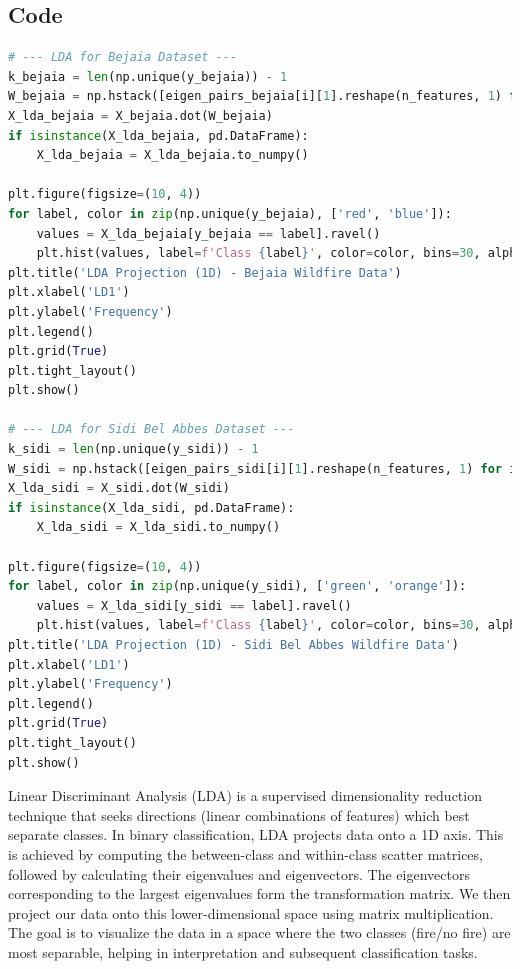 \documentclass[12pt]{article}
\begin{document}
\subsection*{Code}
\begin{lstlisting}[language=Python]
# --- LDA for Bejaia Dataset ---
k_bejaia = len(np.unique(y_bejaia)) - 1
W_bejaia = np.hstack([eigen_pairs_bejaia[i][1].reshape(n_features, 1) for i in range(k_bejaia)])
X_lda_bejaia = X_bejaia.dot(W_bejaia)
if isinstance(X_lda_bejaia, pd.DataFrame):
    X_lda_bejaia = X_lda_bejaia.to_numpy()

plt.figure(figsize=(10, 4))
for label, color in zip(np.unique(y_bejaia), ['red', 'blue']):
    values = X_lda_bejaia[y_bejaia == label].ravel()
    plt.hist(values, label=f'Class {label}', color=color, bins=30, alpha=0.7)
plt.title('LDA Projection (1D) - Bejaia Wildfire Data')
plt.xlabel('LD1')
plt.ylabel('Frequency')
plt.legend()
plt.grid(True)
plt.tight_layout()
plt.show()

# --- LDA for Sidi Bel Abbes Dataset ---
k_sidi = len(np.unique(y_sidi)) - 1
W_sidi = np.hstack([eigen_pairs_sidi[i][1].reshape(n_features, 1) for i in range(k_sidi)])
X_lda_sidi = X_sidi.dot(W_sidi)
if isinstance(X_lda_sidi, pd.DataFrame):
    X_lda_sidi = X_lda_sidi.to_numpy()

plt.figure(figsize=(10, 4))
for label, color in zip(np.unique(y_sidi), ['green', 'orange']):
    values = X_lda_sidi[y_sidi == label].ravel()
    plt.hist(values, label=f'Class {label}', color=color, bins=30, alpha=0.7)
plt.title('LDA Projection (1D) - Sidi Bel Abbes Wildfire Data')
plt.xlabel('LD1')
plt.ylabel('Frequency')
plt.legend()
plt.grid(True)
plt.tight_layout()
plt.show()
\end{lstlisting}

Linear Discriminant Analysis (LDA) is a supervised dimensionality reduction technique that seeks directions (linear combinations of features) which best separate classes. In binary classification, LDA projects data onto a 1D axis. This is achieved by computing the between-class and within-class scatter matrices, followed by calculating their eigenvalues and eigenvectors. The eigenvectors corresponding to the largest eigenvalues form the transformation matrix. We then project our data onto this lower-dimensional space using matrix multiplication. The goal is to visualize the data in a space where the two classes (fire/no fire) are most separable, helping in interpretation and subsequent classification tasks.
\end{document}
